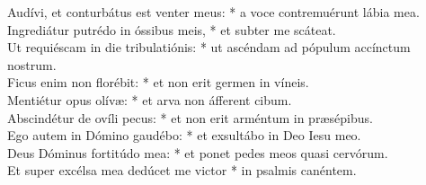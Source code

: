 {	Audívi, et conturbátus est venter meus: * a voce contremuérunt lábia mea. \\
	Ingrediátur putrédo in óssibus meis, * et subter me scáteat. \\
	Ut requiéscam in die tribulatiónis: * ut ascéndam ad pópulum accínctum nostrum. \\
	Ficus enim non florébit: * et non erit germen in víneis. \\
	Mentiétur opus olívæ: * et arva non áfferent cibum. \\
	Abscindétur de ovíli pecus: * et non erit arméntum in præsépibus. \\
	Ego autem in Dómino gaudébo: * et exsultábo in Deo Iesu meo. \\
	Deus Dóminus fortitúdo mea: * et ponet pedes meos quasi cervórum. \\
	Et super excélsa mea dedúcet me victor * in psalmis canéntem. \\
}

